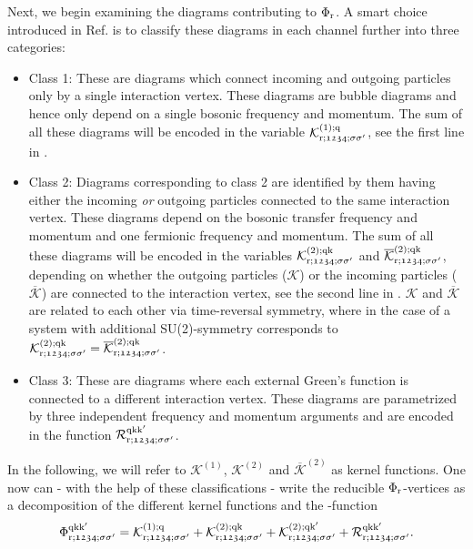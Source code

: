 \documentclass[../../main.tex]{subfiles}
\begin{document}
Next, we begin examining the diagrams contributing to $\Phi_{\text{r}}$. A smart choice introduced in Ref. \cite{high-freq asympt} is to classify these diagrams in each channel further into three categories:
\begin{itemize}
	\item Class 1: These are diagrams which connect incoming and outgoing particles only by a single interaction vertex. These diagrams are bubble diagrams and hence only depend on a single bosonic frequency and momentum. The sum of all these diagrams will be encoded in the variable $\mathcal{K}^{(1);\text{q}}_{\text{r};\mathfrak{1234};\sigma\sigma'}$, see the first line in .
	\item Class 2: Diagrams corresponding to class 2 are identified by them having either the incoming \textit{or} outgoing particles connected to the same interaction vertex. These diagrams depend on the bosonic transfer frequency and momentum and one fermionic frequency and momentum. The sum of all these diagrams will be encoded in the variables $\mathcal{K}^{(2);\text{q}\text{k}}_{\text{r};\mathfrak{1234};\sigma\sigma'}$ and $\overline{\mathcal{K}}^{(2);\text{q}\text{k}}_{\text{r};\mathfrak{1234};\sigma\sigma'}$, depending on whether the outgoing particles ($\mathcal{K}$) or the incoming particles ($\overline{\mathcal{K}}$) are connected to the interaction vertex, see the second line in . $\mathcal{K}$ and $\overline{\mathcal{K}}$ are related to each other via time-reversal symmetry, where in the case of a system with additional SU(2)-symmetry corresponds to \cite{rohringer thesis} $\mathcal{K}^{(2);\text{q}\text{k}}_{\text{r};\mathfrak{1234};\sigma\sigma'}=\overline{\mathcal{K}}^{(2);\text{q}\text{k}}_{\text{r};\mathfrak{1234};\sigma\sigma'}$.
	\item Class 3: These are diagrams where each external Green's function is connected to a different interaction vertex. These diagrams are parametrized by three independent frequency and momentum arguments and are encoded in the  function $\mathcal{R}^{\text{q}\text{k}\text{k}'}_{\text{r};\mathfrak{1234};\sigma\sigma'}$.
\end{itemize}
In the following, we will refer to $\mathcal{K}^{(1)}$, $\mathcal{K}^{(2)}$ and $\overline{\mathcal{K}}^{(2)}$ as kernel functions. One now can - with the help of these classifications - write the reducible $\Phi_{\text{r}}$-vertices as a decomposition of the different kernel functions and the -function
\begin{align}
	\Phi_{\text{r};\mathfrak{1234};\sigma\sigma'}^{\text{q}\text{k}\text{k}'}=\mathcal{K}^{(1);\text{q}}_{\text{r};\mathfrak{1234};\sigma\sigma'}+\mathcal{K}^{(2);\text{q}\text{k}}_{\text{r};\mathfrak{1234};\sigma\sigma'}+\mathcal{K}^{(2);\text{q}\text{k}'}_{\text{r};\mathfrak{1234};\sigma\sigma'}+\mathcal{R}^{\text{q}\text{k}\text{k}'}_{\text{r};\mathfrak{1234};\sigma\sigma'}.
\end{align}
\end{document}
